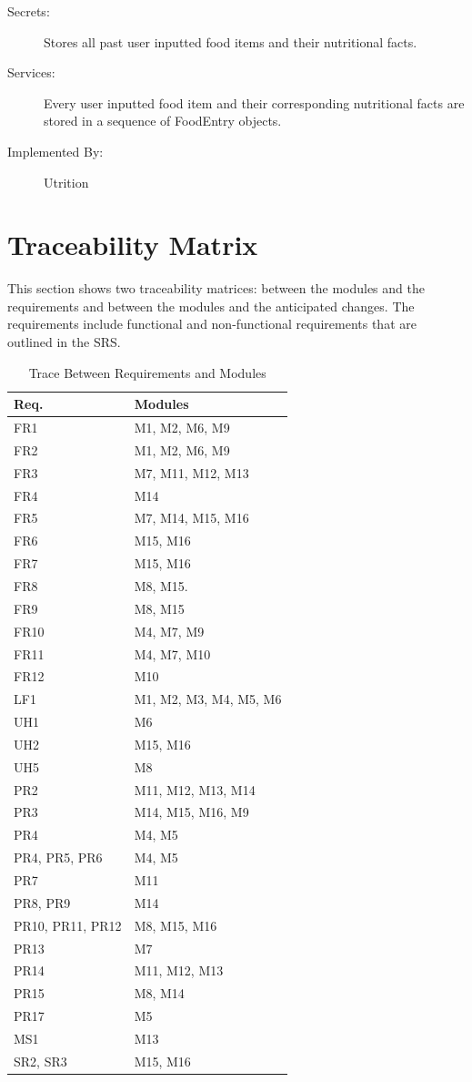 \documentclass[12pt, titlepage]{article}
\begin{document}
\begin{description}
	\item[Secrets:]Stores all past user inputted food items and their nutritional facts.
	\item[Services:]Every user inputted food item and their corresponding nutritional facts are stored in a sequence of FoodEntry objects.
	\item[Implemented By:] Utrition
\end{description}

\section{Traceability Matrix} \label{SecTM}

This section shows two traceability matrices: between the modules and the
requirements and between the modules and the anticipated changes. The requirements include functional and non-functional requirements that are outlined in the SRS.

\begin{table}[H]
\centering
\begin{tabular}{p{} p{}}
\toprule
\textbf{Req.} & \textbf{Modules}\\
\midrule
FR1 & M1, M2, M6, M9\\
FR2 & M1, M2, M6, M9\\
FR3 & M7, M11, M12, M13\\
FR4 & M14\\
FR5 & M7, M14, M15, M16\\
FR6 & M15, M16\\
FR7 & M15, M16\\
FR8 & M8, M15. \\
FR9 & M8, M15\\
FR10 & M4, M7, M9\\
FR11 & M4, M7, M10 \\
FR12 & M10\\
LF1 & M1, M2, M3, M4, M5, M6\\
UH1 & M6\\
UH2 & M15, M16\\
UH5 & M8\\
PR2 & M11, M12, M13, M14\\
PR3 & M14, M15, M16, M9\\
PR4 & M4, M5\\
PR4, PR5, PR6 & M4, M5\\
PR7 & M11\\
PR8, PR9 & M14\\
PR10, PR11, PR12 & M8, M15, M16\\
PR13 & M7\\
PR14 & M11, M12, M13\\
PR15 & M8, M14\\
PR17 & M5\\
MS1 & M13\\
SR2, SR3 & M15, M16\\


\bottomrule
\end{tabular}
\caption{Trace Between Requirements and Modules}
\label{TblRT}
\end{table}
\end{document}
